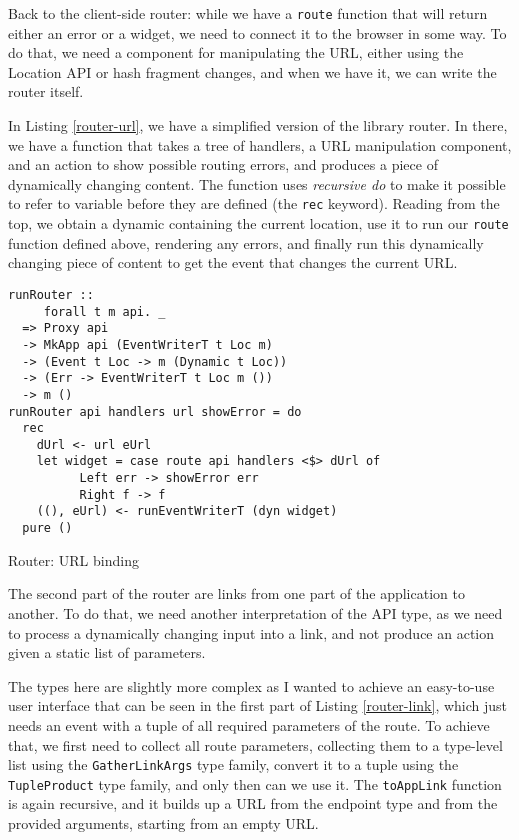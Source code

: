 \documentclass[english,odsaz]{fitthesis}
\begin{document}
Back to the client-side router: while we have a \texttt{route} function that will return
either an error or a widget, we need to connect it to the browser in some way.
To do that, we need a component for manipulating the URL, either using the
Location API or hash fragment changes, and when we have it, we can write the
router itself.

In Listing \ref{router-url}, we have a simplified version of the library
router. In there, we have a function that takes a tree of handlers, a URL
manipulation component, and an action to show possible routing errors, and
produces a piece of dynamically changing content. The function uses \emph{recursive do}
to make it possible to refer to variable before they are defined (the \texttt{rec}
keyword). Reading from the top, we obtain a dynamic containing the current
location, use it to run our \texttt{route} function defined above, rendering any errors,
and finally run this dynamically changing piece of content to get the event that
changes the current URL.

\begin{listing}[htbp]
\begin{verbatim}
runRouter ::
     forall t m api. _
  => Proxy api
  -> MkApp api (EventWriterT t Loc m)
  -> (Event t Loc -> m (Dynamic t Loc))
  -> (Err -> EventWriterT t Loc m ())
  -> m ()
runRouter api handlers url showError = do
  rec
    dUrl <- url eUrl
    let widget = case route api handlers <$> dUrl of
          Left err -> showError err
          Right f -> f
    ((), eUrl) <- runEventWriterT (dyn widget)
  pure ()

\end{verbatim}
\caption{Router: URL binding \label{router-url}}
\end{listing}

The second part of the router are links from one part of the application to
another. To do that, we need another interpretation of the API type, as we need
to process a dynamically changing input into a link, and not produce an action
given a static list of parameters.

The types here are slightly more complex as I wanted to achieve an easy-to-use
user interface that can be seen in the first part of Listing \ref{router-link},
which just needs an event with a tuple of all required parameters of the
route. To achieve that, we first need to collect all route parameters,
collecting them to a type-level list using the \texttt{GatherLinkArgs} type family,
convert it to a tuple using the \texttt{TupleProduct} type family, and only then can we
use it. The \texttt{toAppLink} function is again recursive, and it builds up a URL from
the endpoint type and from the provided arguments, starting from an empty URL.
\end{document}
